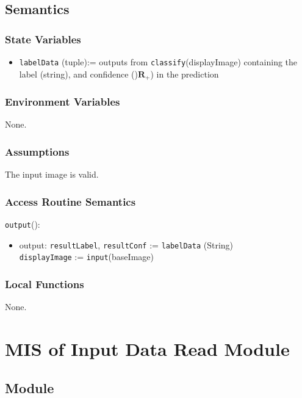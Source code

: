 \documentclass[12pt, titlepage]{article}
\def\code#1{\texttt{#1}}
\begin{document}
\subsection{Semantics}

\subsubsection{State Variables}

\begin{itemize}
\item \code{labelData} (tuple):= outputs from \code{classify}(displayImage) containing the label (string), and confidence ()$\mathbf{R}_{+}$) in the prediction
\end{itemize}

\subsubsection{Environment Variables}

None.

\subsubsection{Assumptions}

The input image is valid.

\subsubsection{Access Routine Semantics}

\noindent \code{output}():
\begin{itemize}
\item output: \code{resultLabel}, \code{resultConf} := \code{labelData} (String)\\
\code{displayImage} := \code{input}(baseImage)
\end{itemize}

\subsubsection{Local Functions}

None.

\section{MIS of Input Data Read Module} \label{ModuleIDR} 

\subsection{Module}
\end{document}
